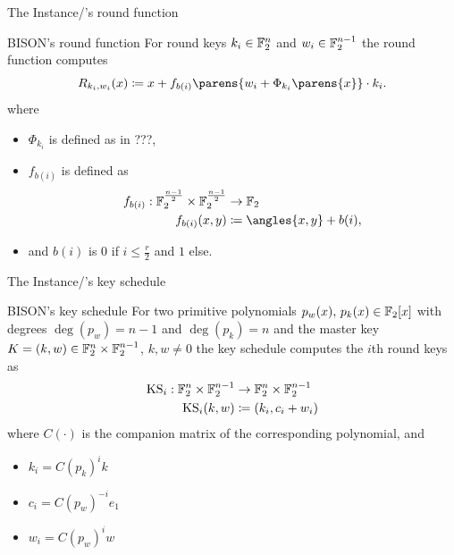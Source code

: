 \begin{frame}{The Instance}{\bison/'s round function}
    \begin{block}{BISON's round function}
        \centering
        \vspace{0.5\baselineskip}
        For round keys $k_i\in \mathbb{F}_2^n$ and $w_i\in \mathbb{F}_2^{n-1}$ the round function computes
        \begin{equation*}
            R_{k_i, w_i}(x) \coloneqq x + f_{b(i)} \parens{w_i + \Phi_{k_i}\parens{x}} \cdot k_i.
        \end{equation*}
        \flushleft
        where
        \begin{itemize}
            \item $\Phi_{k_i}$ is defined as in ???,
            \item $f_{b(i)}$ is defined as
                    \begin{align*}
                        f_{b(i)} : \F_2^{\frac{n-1}{2}}\times \F_2^{\frac{n-1}{2}} &\to \F_2 \\
                        f_{b(i)}(x,y) &\coloneqq \angles{x,y} + b(i),
                    \end{align*}
            \item and $b(i)$ is $0$ if $i \leqslant \frac{r}{2}$ and $1$ else.
        \end{itemize}
        \vspace{-0.25\baselineskip}
    \end{block}
\end{frame}

\begin{frame}{The Instance}{\bison/'s key schedule}
    \begin{block}{BISON's key schedule}
        \vspace{0.5\baselineskip}
        For two primitive polynomials $p_w(x),\, p_k(x) \in \mathbb{F}_2[x]$ with degrees $\deg(p_w) = n-1$ and $\deg(p_k) = n$ and the master key $K=(k,w) \in \mathbb{F}_2^n\times \mathbb{F}_2^{n-1}$, $k,w \ne 0$
        the key schedule computes the $i$th round keys as
        \begin{align*}
            \mathrm{KS}_i : \mathbb{F}_2^n \times \mathbb{F}_2^{n-1} &\to \mathbb{F}_2^n \times \mathbb{F}_2^{n-1} \\
            \mathrm{KS}_i(k, w) &\coloneqq (k_i, c_i + w_i)
        \end{align*}
        where $C(\cdot)$ is the companion matrix of the corresponding polynomial, and
        \begin{itemize}
            \item $k_i = {C(p_k)}^i k$
            \item $c_i = {C(p_w)}^{-i} e_1$
            \item $w_i = {C(p_w)}^i w$
        \end{itemize}
        \vspace{0.5\baselineskip}
    \end{block}
\end{frame}

